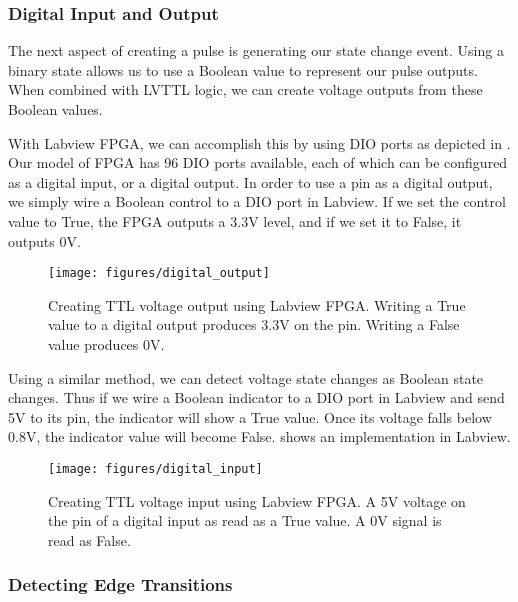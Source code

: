\subsubsection{Digital Input and Output}
\label{digital_input_and_output} 

The next aspect of creating a pulse is generating our state change event.  Using a binary state allows us to use a Boolean value to represent our pulse outputs.  When combined with LVTTL logic, we can create voltage outputs from these Boolean values.

With Labview FPGA, we can accomplish this by using DIO ports as depicted in
.  Our model of FPGA has 96 DIO ports available, each of which can be configured as a digital input, or a digital output.  In order to use a pin as a digital output, we simply wire a Boolean control to a DIO port in Labview.  If we set the control value to True, the FPGA outputs a 3.3V level, and if we set it to False, it outputs 0V.


\begin{figure}[!ht] 
 \centering 
 \texttt{[image: figures/digital\_output]} 
 \caption[Digital Output]{Creating TTL voltage output using Labview FPGA.  Writing a True value to a digital output produces 3.3V on the pin.  Writing a False value produces 0V.} 
 \label{fig:digital_output} 
\end{figure}


Using a similar method, we can detect voltage state changes as Boolean state
changes.  Thus if we wire a Boolean indicator to a DIO port in Labview and
send 5V to its pin, the indicator will show a True value.  Once its voltage
falls below 0.8V, the indicator value will become False.   shows an implementation in Labview.

\begin{figure}[!ht] 
 \centering 
 \texttt{[image: figures/digital\_input]} 
 \caption[Digital Input]{Creating TTL voltage input using Labview FPGA.  A 5V voltage on the pin of a digital input as read as a True value.  A 0V signal is read as False.} 
 \label{fig:digital_input} 
\end{figure}



\subsubsection{Detecting Edge Transitions}
\label{detecting_edge_transitions} 

